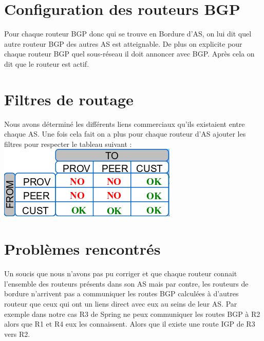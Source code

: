 \documentclass[10pt,a4paper,twocolumn]{article}
\begin{document}
\section{Configuration des routeurs BGP}
Pour chaque routeur BGP donc qui se trouve en Bordure d'AS, on lui dit quel autre routeur BGP des autres AS est atteignable. De plus on explicite pour chaque routeur BGP quel sous-réseau il doit annoncer avec BGP. Après cela on dit que le routeur est actif.
\section{Filtres de routage}
Nous avons déterminé les différents liens commerciaux qu'ils existaient entre chaque AS. Une fois cela fait on a plus pour chaque routeur d'AS ajouter les filtres pour respecter le tableau suivant : 
\includegraphics[scale=0.7]{comlink.png}
\section{Problèmes rencontrés}
Un soucis que nous n'avons pas pu corriger et que chaque routeur connait l'ensemble des routeurs présents dans son AS mais par contre, les routeurs de bordure n'arrivent pas a communiquer les routes BGP calculées à d'autres routeur que ceux qui ont un liens direct avec eux au seins de leur AS.
Par exemple dans notre cas R3 de Spring ne peux communiquer les routes BGP à R2 alors que R1 et R4 eux les connaissent. Alors que il existe une route IGP de R3 vers R2.
\end{document}

